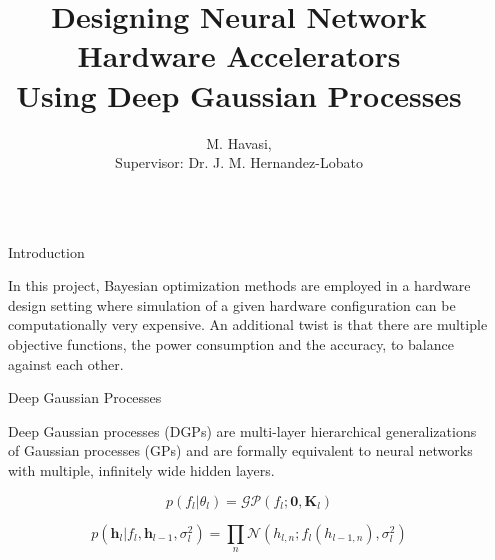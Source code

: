 \documentclass[final]{beamer}
\title{Designing Neural Network Hardware Accelerators \\[0.1in] Using Deep Gaussian Processes
}
\author{M. Havasi, \\ \vspace{0.1in} Supervisor: Dr. J. M. Hernandez-Lobato} %
\institute{June, 2017} %
\newlength{\sepwid}
\newlength{\onecolwid}
\begin{document}

\setlength{\belowcaptionskip}{1ex} %
\setlength\belowdisplayshortskip{1ex} %

\begin{frame}[t] %

\begin{columns}[t] %

\begin{column}{\sepwid}\end{column} %

\begin{column}{\onecolwid} %


\begin{block}{Introduction}

In this project, Bayesian optimization methods are employed in a hardware design setting where simulation of a given hardware configuration can be computationally very expensive. An additional twist is that there are multiple objective functions, the power consumption and the accuracy, to balance against each other.
\end{block}



\begin{block}{Deep Gaussian Processes}

Deep Gaussian processes (DGPs) are multi-layer hierarchical generalizations of Gaussian processes
(GPs) and are formally equivalent to neural networks with multiple, infinitely wide hidden
layers.

$$p(f_l|\theta_l)=\mathcal{GP}(f_l; \boldsymbol 0, \boldsymbol K_l)$$

$$p(\boldsymbol h_l|f_l, \boldsymbol h_{l-1}, \sigma_l^2)=\prod_n\mathcal{N}(h_{l,n};f_l(h_{l-1, n}), \sigma_l^2)$$


\end{block}
\end{column}
\end{columns}
\end{frame}
\end{document}
